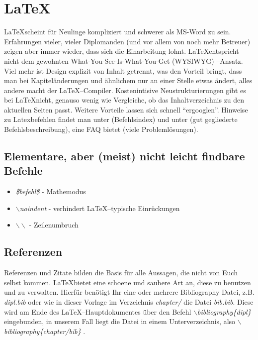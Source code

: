 \section{\LaTeX}
\LaTeX scheint für Neulinge kompliziert und schwerer als MS-Word zu sein. Erfahrungen vieler, vieler Diplomanden (und vor allem von noch mehr Betreuer) zeigen aber immer wieder, dass sich die Einarbeitung lohnt. \LaTeX entspricht nicht dem gewohnten What-You-See-Is-What-You-Get (WYSIWYG) --Ansatz. Viel mehr ist Design explizit von Inhalt getrennt, was den Vorteil bringt, dass man bei Kapiteländerungen und ähnlichem nur an einer Stelle etwas ändert, alles andere macht der \LaTeX --Compiler. Kostenintisive Neustrukturierungen gibt es bei \LaTeX nicht, genauso wenig wie Vergleiche, ob das Inhaltverzeichnis zu den aktuellen Seiten passt. Weitere Vorteile lassen sich schnell ``ergooglen''. Hinweise zu Latexbefehlen findet man unter \cite{latexindex} (Befehlsindex) und unter \cite{latexcookbook} (gut gegliederte Befehlsbeschreibung), eine FAQ bietet \cite{dante} (viele Problemlösungen).

\subsection{Elementare, aber (meist) nicht leicht findbare Befehle}
\begin{itemize}
\item {\em \$befehl\$} - Mathemodus\\
\item {\em {$\backslash$}noindent} - verhindert \LaTeX --typische Einrückungen\\
\item {\em {$\backslash\backslash$}} - Zeilenumbruch\\
\end{itemize}
\subsection{Referenzen}
Referenzen und Zitate bilden die Basis für alle Aussagen, die nicht von Euch selbst kommen. \LaTeX bietet eine schoene und saubere Art an, diese zu benutzen und zu verwalten. Hierfür benötigt Ihr eine oder mehrere Bibliography Datei, z.B. {\em dipl.bib} oder wie in dieser Vorlage im Verzeichnis {\em chapter/} die Datei {\em bib.bib}. Diese wird am Ende des \LaTeX --Hauptdokumentes  über den Befehl {\em {$\backslash$}bibliography\{dipl\} } eingebunden, in unserem Fall liegt die Datei in einem Unterverzeichnis, also {\em {$\backslash$}bibliography\{chapter{\slash}bib\} }.

